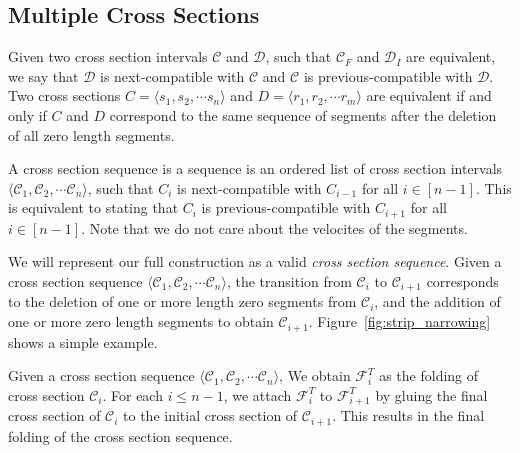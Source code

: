 \subsection{Multiple Cross Sections}
\label{sec:intervals}

\begin{definition}
\label{def:compatible}
Given two cross section intervals $\mathcal C$ and $\mathcal D$, such that $\mathcal C_F$ and $\mathcal D_I$ are equivalent,
we say that $\mathcal D$ is next-compatible with $\mathcal C$ and $\mathcal C$ is previous-compatible with $\mathcal D$.
Two cross sections $C = \langle s_1, s_2,\cdots s_n \rangle$ and $D = \langle r_1, r_2,\cdots r_m \rangle$ are equivalent
if and only if $C$ and $D$ correspond to the same sequence of segments after the deletion of all zero length segments.
\end{definition}

\begin{definition}
\label{def:cross_section_sequence}
A cross section sequence is a sequence is an ordered list of cross section intervals
$ \langle \mathcal C_1, \mathcal C_2,\cdots \mathcal C_n \rangle$,
such that $C_{i}$ is next-compatible with $C_{i-1}$ for all $i\in [n-1]$.
This is equivalent to stating that $C_{i}$ is previous-compatible with $C_{i+1}$ for all $i\in [n-1]$.
Note that we do not care about the velocites of the segments.
\end{definition}

We will represent our full construction as a valid \emph{cross section sequence}.
Given a cross section sequence $\langle \mathcal C_1, \mathcal C_2,\cdots \mathcal C_n \rangle$,
the transition from $\mathcal C_i$ to $\mathcal C_{i+1}$ corresponds to the deletion of one or more
length zero segments from $\mathcal C_i$, and the addition of one or more zero length segments to obtain $\mathcal C_{i+1}$.
Figure~\ref{fig:strip_narrowing} shows a simple example.


\begin{definition}
\label{def:sequence_folding}
Given a cross section sequence $\langle \mathcal C_1, \mathcal C_2,\cdots \mathcal C_n \rangle$,
We obtain $\mathcal F_i^T$ as the folding of cross section $\mathcal C_i$.
For each $i\le n-1$, we attach $\mathcal F_i^T$ to $\mathcal F_{i+1}^T$ by gluing
the final cross section of $\mathcal C_i$ to the initial cross section of $\mathcal C_{i+1}$.
This results in the final folding of the cross section sequence.
\end{definition}

